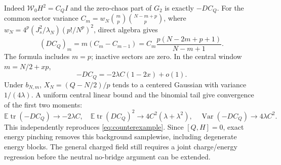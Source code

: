 \documentclass[11pt]{article}
\newcommand{\EE}{\mathbb E}
\newcommand{\tr}{\operatorname{tr}}
\newcommand{\WW}{\mathcal W}
\begin{document}
Indeed $\WW_0H^2=C_QI$ and the zero-chaos part of $G_2$ is exactly
$-DC_Q$. For the common sector variance
$C_m=w_N\binom mp\binom{N-m+p}p$, where
$w_N=4^p(J_s^2/\lambda_N)(p!/N^p)^2$, direct algebra gives
\begin{equation}
 (DC_Q)_m=m(C_m-C_{m-1})
     =C_m\frac{p(N-2m+p+1)}{N-m+1}.\label{eq:chargeexact}
\end{equation}
The formula includes $m=p$; inactive sectors are zero.
In the central window $m=N/2+xp$,
\begin{equation}
 -DC_Q=-2\lambda C(1-2x)+o(1).
\end{equation}
Under $b_{N,m}$, $X_N=(Q-N/2)/p$ tends to a centered Gaussian
with variance $1/(4\lambda)$. A uniform central linear bound and
the binomial tail give convergence of the first two moments:
\begin{equation}
 \EE\tr(-DC_Q)\to-2\lambda C,\quad
 \EE\tr(DC_Q)^2\to4C^2(\lambda+\lambda^2),\quad
 \operatorname{Var}(-DC_Q)\to4\lambda C^2.\label{eq:chargemom}
\end{equation}
This independently reproduces \eqref{eq:counterexample}. Since
$[Q,H]=0$, exact energy pinching removes this background samplewise,
including degenerate energy blocks. The general charged field still
requires a joint charge/energy regression before the neutral
no-bridge argument can be extended.

\newpage
\end{document}
